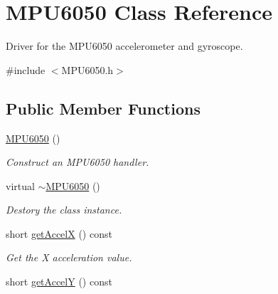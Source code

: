 \hypertarget{class_m_p_u6050}{}\section{M\+P\+U6050 Class Reference}
\label{class_m_p_u6050}


Driver for the M\+P\+U6050 accelerometer and gyroscope.  




{\ttfamily \#include $<$M\+P\+U6050.\+h$>$}

\subsection*{Public Member Functions}
\begin{DoxyCompactItemize}
\item 
\hyperlink{class_m_p_u6050_a7c0146d45537e4bd7a0d4c1c476fdab7}{M\+P\+U6050} ()\hypertarget{class_m_p_u6050_a7c0146d45537e4bd7a0d4c1c476fdab7}{}\label{class_m_p_u6050_a7c0146d45537e4bd7a0d4c1c476fdab7}

\begin{DoxyCompactList}\small\item\em Construct an M\+P\+U6050 handler. \end{DoxyCompactList}\item 
virtual \hyperlink{class_m_p_u6050_a409a2158e89617da2d44c5f6ad93f388}{$\sim$\+M\+P\+U6050} ()\hypertarget{class_m_p_u6050_a409a2158e89617da2d44c5f6ad93f388}{}\label{class_m_p_u6050_a409a2158e89617da2d44c5f6ad93f388}

\begin{DoxyCompactList}\small\item\em Destory the class instance. \end{DoxyCompactList}\item 
short \hyperlink{class_m_p_u6050_ab87ee0611d6919de365940d1c7b988ea}{get\+AccelX} () const \hypertarget{class_m_p_u6050_ab87ee0611d6919de365940d1c7b988ea}{}\label{class_m_p_u6050_ab87ee0611d6919de365940d1c7b988ea}

\begin{DoxyCompactList}\small\item\em Get the X acceleration value. \end{DoxyCompactList}\item 
short \hyperlink{class_m_p_u6050_a5e11a8bc53c314f284a0e1c561fd91b0}{get\+AccelY} () const \hypertarget{class_m_p_u6050_a5e11a8bc53c314f284a0e1c561fd91b0}{}\label{class_m_p_u6050_a5e11a8bc53c314f284a0e1c561fd91b0}


\end{DoxyCompactItemize}
